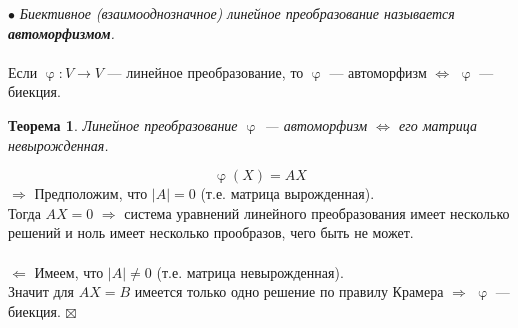 \documentclass[a4paper, 12pt]{article}
\newtheorem*{theorem}{Теорема}
\newenvironment{Proof}
{\par\noindent{$\blacklozenge$}}
{\hfill$\scriptstyle\boxtimes$}
\renewcommand{\varphi}{\upvarphi}
\begin{document}
    $\bullet$ \textit{Биективное (взаимооднозначное) линейное преобразование называется \textbf{автоморфизмом}.}\\\\
    Если $\varphi: V \rightarrow V$ --- линейное преобразование, то $\varphi$ --- автоморфизм $\Leftrightarrow$ $\varphi$ --- биекция.
    \begin{theorem}
        Линейное преобразование $\varphi$ --- автоморфизм $\Leftrightarrow$ его матрица невырожденная.
    \end{theorem}
    \begin{Proof}
    $$\varphi(X)=AX$$
    $\Rightarrow$ Предположим, что $|A| = 0$ (т.е. матрица вырожденная).\\
    Тогда $AX=0$ $\Rightarrow$ система уравнений линейного преобразования имеет несколько решений и ноль имеет несколько прообразов, чего быть не может.\\\\
    $\Leftarrow$ Имеем, что $|A| \neq 0$ (т.е. матрица невырожденная).\\
    Значит для $AX=B$ имеется только одно решение по правилу Крамера $\Rightarrow$ $\varphi$ --- биекция.
    \end{Proof}
\end{document}
